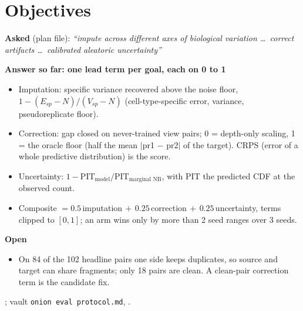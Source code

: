 \documentclass[10pt,letterpaper]{article}
\newcommand{\cl}[1]{#1}
\newcommand{\asked}[1]{\textbf{Asked} (plan file): \emph{``#1''}\par}
\newcommand{\hd}[1]{\textbf{#1}\par}
\begin{document}
\section{Objectives}
\asked{impute across different axes of biological variation \ldots\ correct artifacts \ldots\ calibrated aleatoric uncertainty}
\cl{\hd{Answer so far: one lead term per goal, each on 0 to 1}
\begin{itemize}
\item Imputation: specific variance recovered above the noise floor, $1-(E_{sp}-N)/(V_{sp}-N)$ (cell-type-specific error, variance, pseudoreplicate floor).
\item Correction: gap closed on never-trained view pairs; 0 = depth-only scaling, 1 = the oracle floor (half the mean $|$pr1 $-$ pr2$|$ of the target). CRPS (error of a whole predictive distribution) is the score.
\item Uncertainty: $1-\mathrm{PIT}_{\text{model}}/\mathrm{PIT}_{\text{marginal NB}}$, with PIT the predicted CDF at the observed count.
\item Composite $=0.5\,$imputation$\,+\,0.25\,$correction$\,+\,0.25\,$uncertainty, terms clipped to $[0,1]$; an arm wins only by more than 2 seed ranges over 3 seeds.
\end{itemize}
\hd{Open}
\begin{itemize}
\item On 84 of the 102 headline pairs one side keeps duplicates, so source and target can share fragments; only 18 pairs are clean. A clean-pair correction term is the candidate fix.
\end{itemize}}
\begin{where}
; vault \texttt{onion eval protocol.md}, .
\end{where}

\end{document}
